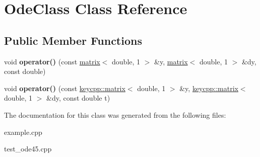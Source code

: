 \hypertarget{class_ode_class}{\section{Ode\-Class Class Reference}
\label{class_ode_class}
}
\subsection*{Public Member Functions}
\begin{DoxyCompactItemize}
\item 
\hypertarget{class_ode_class_ac5fe82b7b611a8fdb89103b742778c89}{void {\bfseries operator()} (const \hyperlink{classkeycpp_1_1matrix}{matrix}$<$ double, 1 $>$ \&y, \hyperlink{classkeycpp_1_1matrix}{matrix}$<$ double, 1 $>$ \&dy, const double)}\label{class_ode_class_ac5fe82b7b611a8fdb89103b742778c89}

\item 
\hypertarget{class_ode_class_abc3eabcda0da3f37065c0ef22a149a2d}{void {\bfseries operator()} (const \hyperlink{classkeycpp_1_1matrix}{keycpp\-::matrix}$<$ double, 1 $>$ \&y, \hyperlink{classkeycpp_1_1matrix}{keycpp\-::matrix}$<$ double, 1 $>$ \&dy, const double t)}\label{class_ode_class_abc3eabcda0da3f37065c0ef22a149a2d}

\end{DoxyCompactItemize}


The documentation for this class was generated from the following files\-:\begin{DoxyCompactItemize}
\item 
example.\-cpp\item 
test\-\_\-ode45.\-cpp\end{DoxyCompactItemize}
